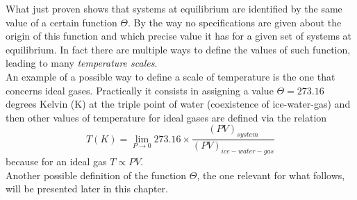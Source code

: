 What just proven shows that systems at equilibrium are identified by the same value of a certain function $\Theta$. By the way no specifications are given about the origin 
of this function and which precise value it has for a given set of systems at equilibrium. In fact there are multiple ways to define the values of such function, leading
to many \emph{temperature scales}. \\
An example of a possible way to define a scale of temperature is the one that concerns ideal gases. Practically it consists in assigning a value $\Theta = 273.16$ degrees Kelvin (K) at the triple point of water (coexistence of ice-water-gas) and then
other values of temperature for ideal gases are defined via the relation 
\begin{equation*}
    T(K) = \lim_{P \to 0} 273.16 \times \frac{(PV)_{system}}{(PV)_{ice-water-gas}}
\end{equation*}
because for an ideal gas $T \propto PV$. \\
Another possible definition of the function $\Theta$, the one relevant for what follows, will be presented later in this chapter.

